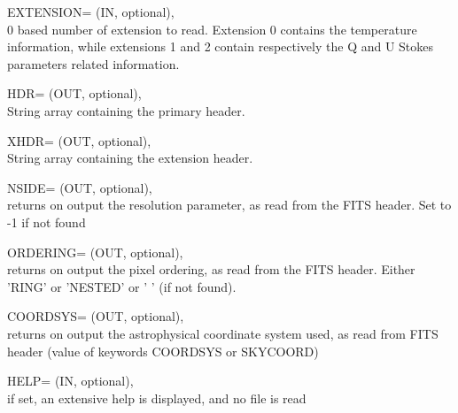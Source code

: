 \begin{keywords}
  \begin{kwlist}{} %
    	\item[EXTENSION=]%
		(IN, optional), \\
		0 based number of extension to read. Extension 0 contains the
temperature information, while extensions 1 and 2 contain respectively the Q
and U Stokes parameters related information.  

    	\item[HDR=]%
		(OUT, optional), \\
		String array containing the primary header. 

    	\item[XHDR=]%
		(OUT, optional), \\
		String array containing the extension header. 

	 \item[{NSIDE=}]  
		(OUT, optional), \\
	        returns on output the \healpix resolution parameter, as read
		from the FITS header. Set to -1 if not found

	 \item[{ORDERING=}] 
	        (OUT, optional), \\
	        returns on output the pixel ordering, as read from the FITS
	        header. Either 'RING' or 'NESTED' or ' ' (if not found).

	 \item[{COORDSYS=}] 
	        (OUT, optional), \\
	        returns on output the astrophysical coordinate system used, 
		as read from FITS header (value of keywords COORDSYS or SKYCOORD)

	 \item[{HELP=}] 
	        (IN, optional), \\ if set, an extensive help is displayed, and no file is read

  \end{kwlist}
\end{keywords}


